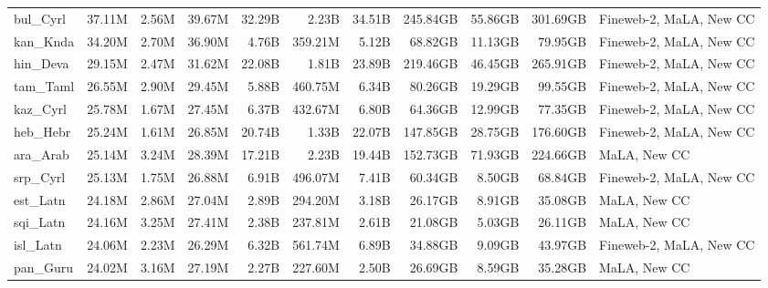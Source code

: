 \begin{table*}[!htp]
{\begin{tabular}{l|rrr|rrr|rrr|l}
bul\_Cyrl                   & 37.11M     & 2.56M        & 39.67M      & 32.29B       & 2.23B          & 34.51B        & 245.84GB   & 55.86GB      & 301.69GB    & Fineweb-2, MaLA, New CC \\
kan\_Knda                   & 34.20M     & 2.70M        & 36.90M      & 4.76B        & 359.21M        & 5.12B         & 68.82GB    & 11.13GB      & 79.95GB     & Fineweb-2, MaLA, New CC \\
hin\_Deva                   & 29.15M     & 2.47M        & 31.62M      & 22.08B       & 1.81B          & 23.89B        & 219.46GB   & 46.45GB      & 265.91GB    & Fineweb-2, MaLA, New CC \\
tam\_Taml                   & 26.55M     & 2.90M        & 29.45M      & 5.88B        & 460.75M        & 6.34B         & 80.26GB    & 19.29GB      & 99.55GB     & Fineweb-2, MaLA, New CC \\
kaz\_Cyrl                   & 25.78M     & 1.67M        & 27.45M      & 6.37B        & 432.67M        & 6.80B         & 64.36GB    & 12.99GB      & 77.35GB     & Fineweb-2, MaLA, New CC \\
heb\_Hebr                   & 25.24M     & 1.61M        & 26.85M      & 20.74B       & 1.33B          & 22.07B        & 147.85GB   & 28.75GB      & 176.60GB    & Fineweb-2, MaLA, New CC \\
ara\_Arab                   & 25.14M     & 3.24M        & 28.39M      & 17.21B       & 2.23B          & 19.44B        & 152.73GB   & 71.93GB      & 224.66GB    & MaLA, New CC            \\
srp\_Cyrl                   & 25.13M     & 1.75M        & 26.88M      & 6.91B        & 496.07M        & 7.41B         & 60.34GB    & 8.50GB       & 68.84GB     & Fineweb-2, MaLA, New CC \\
est\_Latn                   & 24.18M     & 2.86M        & 27.04M      & 2.89B        & 294.20M        & 3.18B         & 26.17GB    & 8.91GB       & 35.08GB     & MaLA, New CC            \\
sqi\_Latn                   & 24.16M     & 3.25M        & 27.41M      & 2.38B        & 237.81M        & 2.61B         & 21.08GB    & 5.03GB       & 26.11GB     & MaLA, New CC            \\
isl\_Latn                   & 24.06M     & 2.23M        & 26.29M      & 6.32B        & 561.74M        & 6.89B         & 34.88GB    & 9.09GB       & 43.97GB     & Fineweb-2, MaLA, New CC \\
pan\_Guru                   & 24.02M     & 3.16M        & 27.19M      & 2.27B        & 227.60M        & 2.50B         & 26.69GB    & 8.59GB       & 35.28GB     & MaLA, New CC            \\

\end{tabular}}
\end{table*}

